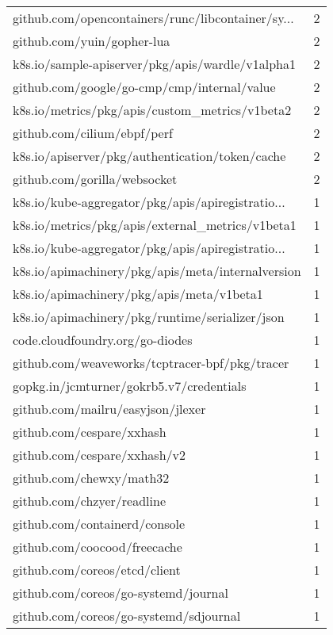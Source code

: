 \begin{longtable}{lr}
    github.com/opencontainers/runc/libcontainer/sy... &        2 \\
    github.com/yuin/gopher-lua &        2 \\
    k8s.io/sample-apiserver/pkg/apis/wardle/v1alpha1 &        2 \\
    github.com/google/go-cmp/cmp/internal/value &        2 \\
    k8s.io/metrics/pkg/apis/custom\_metrics/v1beta2 &        2 \\
    github.com/cilium/ebpf/perf &        2 \\
    k8s.io/apiserver/pkg/authentication/token/cache &        2 \\
    github.com/gorilla/websocket &        2 \\
    k8s.io/kube-aggregator/pkg/apis/apiregistratio... &        1 \\
    k8s.io/metrics/pkg/apis/external\_metrics/v1beta1 &        1 \\
    k8s.io/kube-aggregator/pkg/apis/apiregistratio... &        1 \\
    k8s.io/apimachinery/pkg/apis/meta/internalversion &        1 \\
    k8s.io/apimachinery/pkg/apis/meta/v1beta1 &        1 \\
    k8s.io/apimachinery/pkg/runtime/serializer/json &        1 \\
    code.cloudfoundry.org/go-diodes &        1 \\
    github.com/weaveworks/tcptracer-bpf/pkg/tracer &        1 \\
    gopkg.in/jcmturner/gokrb5.v7/credentials &        1 \\
    github.com/mailru/easyjson/jlexer &        1 \\
    github.com/cespare/xxhash &        1 \\
    github.com/cespare/xxhash/v2 &        1 \\
    github.com/chewxy/math32 &        1 \\
    github.com/chzyer/readline &        1 \\
    github.com/containerd/console &        1 \\
    github.com/coocood/freecache &        1 \\
    github.com/coreos/etcd/client &        1 \\
    github.com/coreos/go-systemd/journal &        1 \\
    github.com/coreos/go-systemd/sdjournal &        1 \\

\end{longtable}
